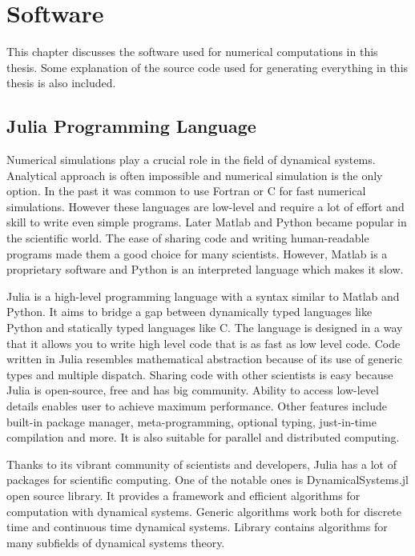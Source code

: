 \chapter{Software}
\label{sec:software}

This chapter discusses the software used for numerical computations in this thesis.
Some explanation of the source code used for generating everything in this thesis is also included.

\section{Julia Programming Language}
Numerical simulations play a crucial role in the field of dynamical systems.
Analytical approach is often impossible and numerical simulation is the only option.
In the past it was common to use Fortran or C for fast numerical simulations.
However these languages are low-level and require a lot of effort and skill to write even simple programs.
Later Matlab and Python became popular in the scientific world.
The ease of sharing code and writing human-readable programs made them a good choice for many scientists.
However, Matlab is a proprietary software and Python is an interpreted language which makes it slow.
\par
Julia is a high-level programming language with a syntax similar to Matlab and Python.
It aims to bridge a gap between dynamically typed languages like Python and statically typed languages like C.
The language is designed in a way that it allows you to write high level code that is as fast as low level code.
Code written in Julia resembles mathematical abstraction because of its use of generic types and multiple dispatch. 
Sharing code with other scientists is easy because Julia is open-source, free and has big community. 
Ability to access low-level details enables user to achieve maximum performance.
Other features include built-in package manager, meta-programming, optional typing, just-in-time compilation and more.
It is also suitable for parallel and distributed computing.~\cite{Bezanson2017,Bezanson20181024}
\par
Thanks to its vibrant community of scientists and developers, Julia has a lot of packages for scientific computing.
One of the notable ones is DynamicalSystems.jl open source library.
It provides a framework and efficient algorithms for computation with dynamical systems.
Generic algorithms work both for discrete time and continuous time dynamical systems.
Library contains algorithms for many subfields of dynamical systems theory.~\cite{Datseris2018}
